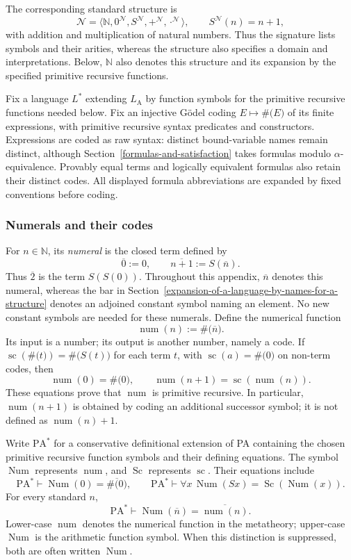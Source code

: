 \documentclass[11pt]{article}
\newcommand{\N}{\mathbb N}
\newcommand{\LA}{L_{\mathrm A}}
\newcommand{\PA}{\mathrm{PA}^{*}}
\newcommand{\num}{\operatorname{num}}
\newcommand{\Num}{\operatorname{Num}}
\newcommand{\scod}{\operatorname{sc}}
\newcommand{\Sc}{\operatorname{Sc}}
\newcommand{\code}[1]{\#\bigl(#1\bigr)}
\newcommand{\bn}[1]{\overline{#1}}
\newcommand{\defeq}{\mathrel{:=}}
\theoremstyle{definition}
\begin{document}
The corresponding standard structure is
\[
 \mathcal N=\langle\N,0^{\mathcal N},S^{\mathcal N},+^{\mathcal N},
                         \cdot^{\mathcal N}\rangle,
 \qquad S^{\mathcal N}(n)=n+1,
\]
with addition and multiplication of natural numbers. Thus the signature
lists symbols and their arities, whereas the structure also specifies a
domain and interpretations. Below, $\N$ also denotes this structure and
its expansion by the specified primitive recursive functions.

Fix a language $L^{*}$ extending $\LA$ by function symbols for the
primitive recursive functions needed below. Fix an
injective G\"odel coding $E\mapsto\code{E}$ of its finite expressions,
with primitive recursive syntax predicates and constructors. Expressions
are coded as raw syntax: distinct bound-variable names remain distinct,
although Section~\ref{formulas-and-satisfaction} takes formulas modulo
$\alpha$-equivalence. Provably equal terms and logically equivalent
formulas also retain their distinct codes. All displayed formula abbreviations are
expanded by fixed conventions before coding.

\subsubsection*{Numerals and their codes}
For $n\in\N$, its \emph{numeral} is the closed term defined by
\[
  \bn0\defeq 0,\qquad \bn{n+1}\defeq S(\bn n).
\]
Thus $\bn2$ is the term $S(S(0))$. Throughout this appendix, $\bn n$
denotes this numeral, whereas the bar in
Section~\ref{expansion-of-a-language-by-names-for-a-structure} denotes an
adjoined constant symbol naming an element. No new constant symbols
are needed for these numerals. Define the numerical function
\begin{equation}\label{eq:num}
  \boxed{\num(n)\defeq\code{\bn n}.}
\end{equation}
Its input is a number; its output is another number, namely a code.
If $\scod(\code t)=\code{S(t)}$ for each term $t$, with
$\scod(a)=\code0$ on non-term codes, then
\begin{equation}\label{eq:num-recursion}
  \num(0)=\code0,\qquad
  \num(n+1)=\scod(\num(n)).
\end{equation}
These equations prove that $\num$ is primitive recursive. In particular,
$\num(n+1)$ is obtained by coding an additional successor symbol; it is
not defined as $\num(n)+1$.

Write $\PA$ for a conservative definitional extension of PA containing
the chosen primitive recursive function symbols and their defining
equations. The symbol $\Num$ represents $\num$, and $\Sc$ represents
$\scod$. Their equations include
\[
  \PA\vdash \Num(0)=\bn{\code0},\qquad
  \PA\vdash \forall x\,\Num(Sx)=\Sc(\Num(x)).
\]
For every standard $n$,
\begin{equation}\label{eq:num-evaluation}
  \PA\vdash\Num(\bn n)=\bn{\num(n)}.
\end{equation}
Lower-case $\num$ denotes the numerical function in the metatheory;
upper-case $\Num$ is the arithmetic function symbol. When this
distinction is suppressed, both are often written $\Num$.
\end{document}
